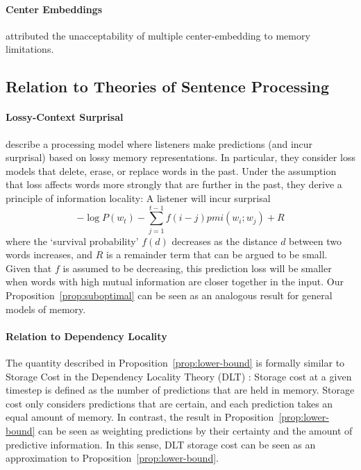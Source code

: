 \documentclass[11pt,letterpaper]{article}
\begin{document}
\paragraph{Center Embeddings}

\cite{miller-finitary-1963} attributed the unacceptability of multiple center-embedding to memory limitations.








\subsection{Relation to Theories of Sentence Processing}


\paragraph{Lossy-Context Surprisal}
\citet{futrell-noisy-context-2017} describe a processing model where listeners make predictions (and incur surprisal) based on lossy memory representations.
In particular, they consider loss models that delete, erase, or replace words in the past.
Under the assumption that loss affects words more strongly that are further in the past, they derive a principle of information locality:
A listener will incur surprisal
$$ -\log P(w_t) - \sum_{j=1}^{t-1} f(i-j) pmi(w_i; w_j) + R$$
where the `survival probability' $f(d)$ decreases as the distance $d$ between two words increases, and $R$ is a remainder term that can be argued to be small.
Given that $f$ is assumed to be decreasing, this prediction loss will be smaller when words with high mutual information are closer together in the input.
Our Proposition~\ref{prop:suboptimal} can be seen as an analogous result for general models of memory.






\paragraph{Relation to Dependency Locality}
The quantity described in Proposition~\ref{prop:lower-bound} is formally similar to Storage Cost in the Dependency Locality Theory (DLT) \citep{gibson-linguistic-1998}: Storage cost at a given timestep is defined as the number of predictions that are held in memory.
Storage cost only considers predictions that are certain, and each prediction takes an equal amount of memory.
In contrast, the result in Proposition~\ref{prop:lower-bound} can be seen as weighting predictions by their certainty and the amount of predictive information.
In this sense, DLT storage cost can be seen as an approximation to Proposition~\ref{prop:lower-bound}.
\end{document}
